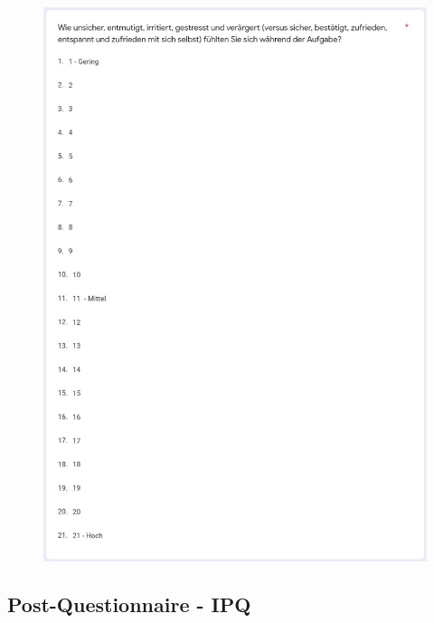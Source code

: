 \documentclass[a4paper,11pt]{article}%
\renewcommand{\\}{\vspace*{0.5\baselineskip} \newline}
\begin{document}
{{	\begin{figure}[H]
	\centering
		\begin{footnotesize}
			\includegraphics[scale=0.6]{Abbildungen/Fragebogen/Post-Questionnaire/PQTLX6}
		\end{footnotesize}
	\end{figure}	

\newpage
\subsection{Post-Questionnaire - IPQ}
\label{Post-Questionnaire - IPQ}

}}
\end{document}
